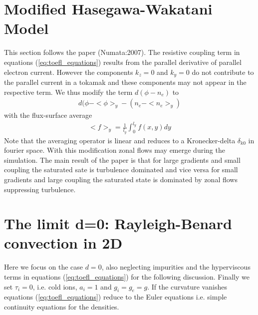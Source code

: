 \documentclass[a4paper,12pt]{scrartcl}
\begin{document}
\section{ Modified Hasegawa-Wakatani Model}
\label{seq:modified}
This section follows the paper (Numata:2007). The resistive coupling term
in equations (\ref{eq:toefl_equations}) results from the parallel 
derivative of parallel electron current. However the components 
$k_z=0$ and $k_y=0$ do not contribute to the parallel current in a tokamak
and 
these components may not appear in the respective term. 
We thus modify the term $d(\phi - n_e)$ to 
\begin{align}
d(\phi - <\phi>_y - (n_e - <n_e>_y)
\end{align}
with the flux-surface average
\begin{align}
 <f>_y = \frac{1}{l_y}\int_0^{l_y}f(x,y)dy
\end{align}
Note that the averaging operator is linear and reduces to a Kronecker-delta
 $\delta_{k0}$ in fourier space. With this modification zonal flows 
 may emerge during the simulation.
 The main result of the paper is that for large gradients and 
 small coupling the saturated sate is turbulence dominated and 
 vice versa for small gradients and large coupling the saturated state 
 is dominated by zonal flows suppressing turbulence.
\section{ The limit d=0: Rayleigh-Benard convection in 2D}
\label{sec:rayleigh-benard}
Here we focus on the case $d=0$, also neglecting impurities and the hyperviscous 
terms in equations (\ref{eq:toefl_equations}) for the following discussion. 
Finally we set $\tau_i=0$, i.e. cold ions, $a_i=1$ and $g_i=g_e=g$.
If the curvature vanishes equations (\ref{eq:toefl_equations}) reduce to the Euler 
equations i.e. simple continuity equations for the densities. 
\end{document}
